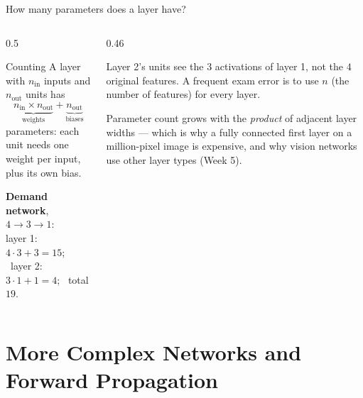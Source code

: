 \documentclass[aspectratio=169,10pt]{beamer}
\begin{document}
\begin{frame}{How many parameters does a layer have?}
  \begin{columns}[T,onlytextwidth]
    \begin{column}{0.5\textwidth}
      \begin{block}{Counting}
        A layer with $n_{\text{in}}$ inputs and $n_{\text{out}}$ units has
        \[ \underbrace{n_{\text{in}}\times n_{\text{out}}}_{\text{weights}}
           + \underbrace{n_{\text{out}}}_{\text{biases}} \]
        parameters: each unit needs one weight per input, plus its own bias.
      \end{block}
      \footnotesize
      \textbf{Demand network}, $4\to3\to1$:\\
      layer 1: $4\cdot3+3=15$; \ layer 2: $3\cdot1+1=4$; \ total $19$.
    \end{column}
    \begin{column}{0.46\textwidth}
      \begin{pitfall}
        \small
        Layer 2's units see the $3$ activations of layer 1, not the $4$ original features. A
        frequent exam error is to use $n$ (the number of features) for every layer.
      \end{pitfall}
      \footnotesize
      Parameter count grows with the \emph{product} of adjacent layer widths --- which is why
      a fully connected first layer on a million-pixel image is expensive, and why vision
      networks use other layer types (Week 5).
    \end{column}
  \end{columns}
\end{frame}

\section{More Complex Networks and Forward Propagation}
\end{document}
